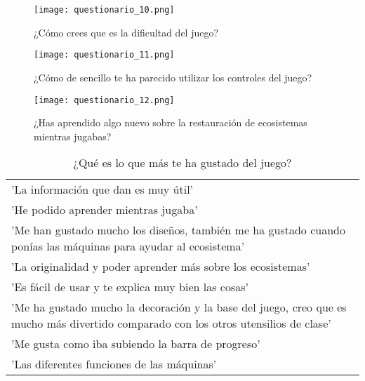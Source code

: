 \begin{figure}[H]
  \centering
  \texttt{[image: questionario\_10.png]}
  \caption{¿Cómo crees que es la dificultad del juego?}
  \label{fig:questionario_10}
\end{figure}
\raggedbottom

\begin{figure}[H]
  \centering
  \texttt{[image: questionario\_11.png]}
  \caption{¿Cómo de sencillo te ha parecido utilizar los controles del juego?}
  \label{fig:questionario_11}
\end{figure}
\raggedbottom

\begin{figure}[H]
  \centering
  \texttt{[image: questionario\_12.png]}
  \caption{¿Has aprendido algo nuevo sobre la restauración de ecosistemas mientras jugabas?}
  \label{fig:questionario_12}
\end{figure}
\raggedbottom

\begin{table}[H]
  \begin{center}
  \setlength{\tabcolsep}{5pt}
  \renewcommand{\arraystretch}{1.2}
  \begin{tabular}{ | m{\textwidth} | } 
    \hline
    'La información que dan es muy útil' \\ 
    'He podido aprender mientras jugaba' \\ 
    'Me han gustado mucho los diseños, también me ha gustado cuando ponías las máquinas para ayudar al ecosistema' \\ 
    'La originalidad y poder aprender más sobre los ecosistemas' \\ 
    'Es fácil de usar y te explica muy bien las cosas' \\ 
    'Me ha gustado mucho la decoración y la base del juego, creo que es mucho más divertido comparado con los otros utensilios de clase' \\ 
    'Me gusta como iba subiendo la barra de progreso' \\ 
    'Las diferentes funciones de las máquinas' \\ 
    \hline
  \end{tabular}
  \centering
  \caption{¿Qué es lo que más te ha gustado del juego?}
  \label{fig:tablaResultadosPC}
  \end{center}
\end{table}  
 
